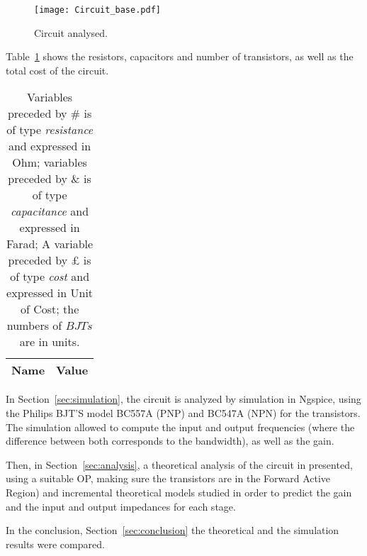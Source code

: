 \begin{figure}[h] 
	\centering
	\texttt{[image: Circuit\_base.pdf]}
	\caption{Circuit analysed.}
	\label{fig:Circuit_Base}
\end{figure}

\newpage

Table~\ref{tab:VALUES} shows the resistors, capacitors and number of transistors, as well as the total cost of the circuit.

\begin{table}[h]
  \centering
  \begin{tabular}{|l|r|}
    \hline    
    {\bf Name} & {\bf Value} \\ \hline
    
  \end{tabular}
  \caption{Variables preceded by \# is of type {\em resistance} and expressed in Ohm; variables preceded by \& is of type {\em capacitance} and expressed in Farad; A variable preceded by £ is of type {\it cost} and expressed in Unit of Cost; the numbers of $BJTs$ are in units.}
  \label{tab:VALUES}
\end{table}

In Section~\ref{sec:simulation}, the circuit is analyzed by simulation in Ngspice, using the Philips BJT’S model BC557A (PNP) and BC547A (NPN) for the transistors. The simulation allowed to compute the input and output frequencies (where the difference between both corresponds to the bandwidth), as well as the gain.	\par
Then, in Section~\ref{sec:analysis}, a theoretical analysis of the circuit in presented, using a suitable OP, making sure the transistors are in the Forward Active Region) and incremental theoretical models studied in order to predict the gain and the input and output impedances for each stage. \par
In the conclusion, Section~\ref{sec:conclusion} the theoretical and the simulation results were compared.
